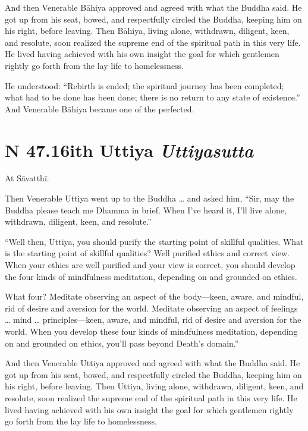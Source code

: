\documentclass[12pt,openany]{book}%
\newcommand*{\suttatitleacronym}[1]{\smaller[2]{#1}\vspace*{.3em}}
\newcommand*{\suttatitletranslation}[1]{\linebreak{#1}}
\newcommand*{\suttatitleroot}[1]{\linebreak\smaller[2]\itshape{#1}}
\newcommand*{\tocacronym}[1]{\hspace*{-3.3em}{#1}\quad}
\newcommand*{\toctranslation}[1]{#1}
\newcommand*{\tocroot}[1]{(\textit{#1})}
\begin{document}
And then Venerable \textsanskrit{Bāhiya} approved and agreed with what the Buddha said. He got up from his seat, bowed, and respectfully circled the Buddha, keeping him on his right, before leaving. Then \textsanskrit{Bāhiya}, living alone, withdrawn, diligent, keen, and resolute, soon realized the supreme end of the spiritual path in this very life. He lived having achieved with his own insight the goal for which gentlemen rightly go forth from the lay life to homelessness. 

He understood: “Rebirth is ended; the spiritual journey has been completed; what had to be done has been done; there is no return to any state of existence.” And Venerable \textsanskrit{Bāhiya} became one of the perfected. 

%
\section*{{\suttatitleacronym SN 47.16}{\suttatitletranslation With Uttiya }{\suttatitleroot Uttiyasutta}}
\addcontentsline{toc}{section}{\tocacronym{SN 47.16} \toctranslation{With Uttiya } \tocroot{Uttiyasutta}}

At \textsanskrit{Sāvatthī}. 

Then Venerable Uttiya went up to the Buddha … and asked him, “Sir, may the Buddha please teach me Dhamma in brief. When I’ve heard it, I’ll live alone, withdrawn, diligent, keen, and resolute.” 

“Well then, Uttiya, you should purify the starting point of skillful qualities. What is the starting point of skillful qualities? Well purified ethics and correct view. When your ethics are well purified and your view is correct, you should develop the four kinds of mindfulness meditation, depending on and grounded on ethics. 

What four? Meditate observing an aspect of the body—keen, aware, and mindful, rid of desire and aversion for the world. Meditate observing an aspect of feelings … mind … principles—keen, aware, and mindful, rid of desire and aversion for the world. When you develop these four kinds of mindfulness meditation, depending on and grounded on ethics, you’ll pass beyond Death’s domain.” 

And then Venerable Uttiya approved and agreed with what the Buddha said. He got up from his seat, bowed, and respectfully circled the Buddha, keeping him on his right, before leaving. Then Uttiya, living alone, withdrawn, diligent, keen, and resolute, soon realized the supreme end of the spiritual path in this very life. He lived having achieved with his own insight the goal for which gentlemen rightly go forth from the lay life to homelessness. 
\end{document}
